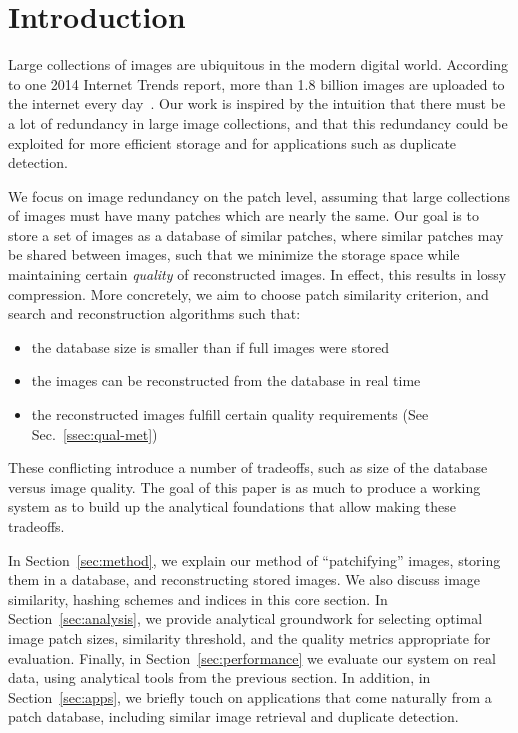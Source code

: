 \section{Introduction}

Large collections of images are ubiquitous in the modern digital world.
According to one 2014 Internet Trends report,
more than 1.8 billion images are uploaded to the internet every day~\cite{meeker2014internet}.
Our work is inspired by the intuition that there must be a lot of redundancy
in large image collections, and that this redundancy could
be exploited for more efficient storage and for applications such as duplicate detection.

We focus on image redundancy on the patch level, assuming that large collections
of images must have many patches which are nearly the same.
Our goal is to store a set of images as a database of
similar patches, where similar patches may be shared between images,
 such that we minimize the storage space while maintaining certain \emph{quality}
of reconstructed images. In effect, this results in lossy compression. More concretely,
we aim to choose patch similarity criterion, and search and reconstruction algorithms such
that:
\begin{itemize}
\item the database size is smaller than if full images were stored
\item the images can be reconstructed from the database in real time
\item the reconstructed images fulfill certain quality requirements (See Sec.~\ref{ssec:qual-met})
\end{itemize}
These conflicting introduce a number of tradeoffs, such as size of
the database versus image quality.
The goal of this paper is as much to produce a working system as to
build up the analytical foundations that allow making these tradeoffs.

In Section~\ref{sec:method}, we explain our method of ``patchifying'' images,
storing them in a database, and reconstructing stored images. We also
discuss image similarity, hashing schemes and indices in this core section.
In Section~\ref{sec:analysis}, we provide analytical groundwork for
selecting optimal image patch sizes, similarity threshold, and the quality metrics
appropriate for evaluation. Finally, in Section~\ref{sec:performance}
we evaluate our system on real data, using analytical tools from the previous section.
In addition, in Section~\ref{sec:apps}, we briefly touch on applications that come naturally
from a patch database, including similar image retrieval and duplicate detection.

